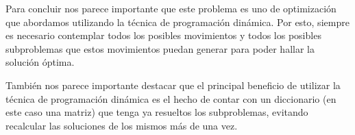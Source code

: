 Para concluir nos parece importante que este problema es uno de optimización que abordamos utilizando la técnica de programación dinámica. Por esto, siempre es necesario contemplar todos los posibles movimientos y todos los posibles subproblemas que estos movimientos puedan generar para poder hallar la solución óptima.

También nos parece importante destacar que el principal beneficio de utilizar la técnica de programación dinámica es el hecho de contar con un diccionario (en este caso una matriz) que tenga ya resueltos los subproblemas, evitando recalcular las soluciones de los mismos más de una vez.